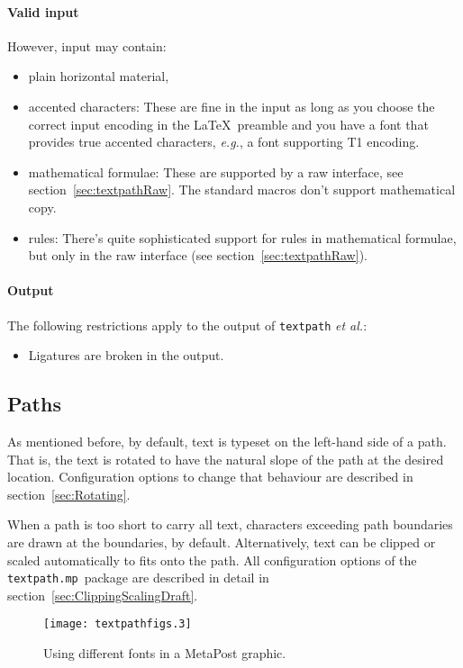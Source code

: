 \documentclass{article}
\newcommand*{\cmd}[1]{\texttt{#1}}
\newcommand*{\pkg}{\cmd{textpath.mp}}
\begin{document}
\paragraph{Valid input}  However, input may contain:
\begin{itemize}
\item plain horizontal material,
\item accented characters: These are fine in the input as long as you choose the correct input encoding in the \LaTeX\ preamble and you have a font that provides true accented characters, \emph{e.g.}, a font supporting T1 encoding.
\item mathematical formulae:  These are supported by a raw interface, see section~\ref{sec:textpathRaw}.  The standard macros don't support mathematical copy.
\item rules:  There's quite sophisticated support for rules in mathematical formulae, but only in the raw interface (see section~\ref{sec:textpathRaw}).
\end{itemize}

\paragraph{Output}  The following restrictions apply to the output of \cmd{textpath} \emph{et al.}:
\begin{itemize}
\item Ligatures are broken in the output.
\end{itemize}


\subsection{Paths}\label{sec:paths}
As mentioned before, by default, text is typeset on the left-hand side of a path.  That is, the text is rotated to have the natural slope of the path at the desired location.  Configuration options to change that behaviour are described in section~\ref{sec:Rotating}.

When a path is too short to carry all text, characters exceeding path boundaries are drawn at the boundaries, by default.  Alternatively, text can be clipped or scaled automatically to fits onto the path.  All configuration options of the \pkg\ package are described in detail in section~\ref{sec:ClippingScalingDraft}.

\begin{figure}
\centering
  \texttt{[image: textpathfigs.3]}
  \caption{Using different fonts in a MetaPost graphic.}
  \label{fig:textpathFont}
\end{figure}
\end{document}
